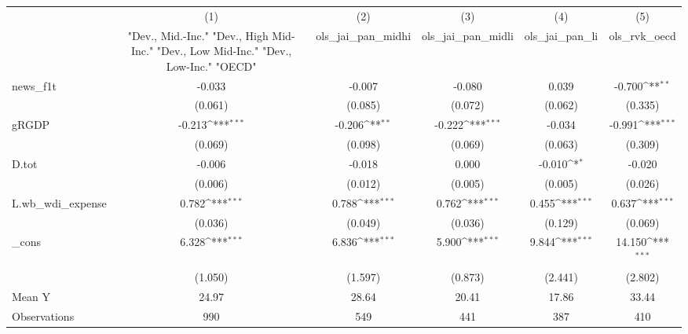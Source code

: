 {
\def\sym#1{\ifmmode^{#1}\else\(^{#1}\)\fi}
\begin{tabular}{l*{5}{c}}
\toprule
            &\multicolumn{1}{c}{(1)}&\multicolumn{1}{c}{(2)}&\multicolumn{1}{c}{(3)}&\multicolumn{1}{c}{(4)}&\multicolumn{1}{c}{(5)}\\
            &\multicolumn{1}{c}{ "Dev., Mid.-Inc." "Dev., High Mid-Inc." "Dev., Low Mid-Inc." "Dev., Low-Inc." "OECD" }&\multicolumn{1}{c}{ols\_jai\_pan\_midhi}&\multicolumn{1}{c}{ols\_jai\_pan\_midli}&\multicolumn{1}{c}{ols\_jai\_pan\_li}&\multicolumn{1}{c}{ols\_rvk\_oecd}\\
\midrule
news\_f1t    &      -0.033         &      -0.007         &      -0.080         &       0.039         &      -0.700\sym{**} \\
            &     (0.061)         &     (0.085)         &     (0.072)         &     (0.062)         &     (0.335)         \\
\addlinespace
gRGDP       &      -0.213\sym{***}&      -0.206\sym{**} &      -0.222\sym{***}&      -0.034         &      -0.991\sym{***}\\
            &     (0.069)         &     (0.098)         &     (0.069)         &     (0.063)         &     (0.309)         \\
\addlinespace
D.tot       &      -0.006         &      -0.018         &       0.000         &      -0.010\sym{*}  &      -0.020         \\
            &     (0.006)         &     (0.012)         &     (0.005)         &     (0.005)         &     (0.026)         \\
\addlinespace
L.wb\_wdi\_expense&       0.782\sym{***}&       0.788\sym{***}&       0.762\sym{***}&       0.455\sym{***}&       0.637\sym{***}\\
            &     (0.036)         &     (0.049)         &     (0.036)         &     (0.129)         &     (0.069)         \\
\addlinespace
\_cons      &       6.328\sym{***}&       6.836\sym{***}&       5.900\sym{***}&       9.844\sym{***}&      14.150\sym{***}\\
            &     (1.050)         &     (1.597)         &     (0.873)         &     (2.441)         &     (2.802)         \\
\midrule
Mean Y      &       24.97         &       28.64         &       20.41         &       17.86         &       33.44         \\
Observations&         990         &         549         &         441         &         387         &         410         \\
\bottomrule
\end{tabular}
}

